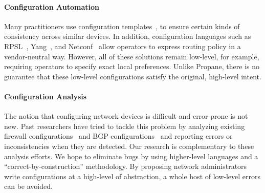 \documentclass{sig-alternate-10pt}
\newcommand{\sysname}{{\small \sf Propane}\xspace}
\begin{document}
\paragraph*{Configuration Automation}
Many practitioners use configuration templates~\cite{hatch,thwack}, to ensure certain kinds of consistency across similar devices. In addition, configuration languages such as RPSL~\cite{RFC2622}, Yang~\cite{RFC6020}, and Netconf~\cite{RFC6241} allow operators to express routing policy in a vendor-neutral way. 
However, all of these solutions remain low-level, for example, requiring operators to specify exact local preferences. Unlike \sysname, there is no guarantee that these low-level configurations satisfy the original, high-level intent.

\paragraph*{Configuration Analysis}  
The notion that configuring network devices is difficult and error-prone is not new.  
Past researchers have tried to tackle this problem by analyzing existing
firewall configurations~\cite{fang,lumeta,margrave} and
BGP configurations~\cite{feamster+:rcc,feamster:thesis,ipassure,batfish,bagpipe} and reporting errors or inconsistencies when they are detected.
Our research is complementary to these analysis
efforts.  We hope to eliminate bugs by using higher-level
languages and a ``correct-by-construction''
methodology.  By proposing network administrators write configurations
at a high-level of abstraction, a whole host of low-level errors can be avoided.
\end{document}
